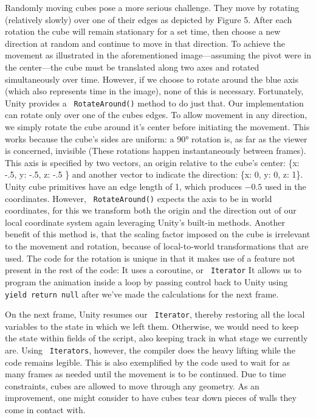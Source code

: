 \documentclass{report}
\newcommand{\cs}[1]{\texttt{\penalty 100 #1}}
\begin{document}
Randomly moving cubes pose a more serious challenge.
They move by rotating (relatively slowly) over one of their edges as depicted by Figure 5.
 After each rotation the cube will remain stationary for a set time, then choose a new direction at random and continue to move in that direction.
To achieve the movement as illustrated in the aforementioned image---assuming the pivot were in the center---the cube must be translated along two axes and rotated simultaneously over time. 
  However, if we choose to rotate around the blue axis (which also represents time in the image), none of this is necessary.
 Fortunately, Unity provides a \cs{RotateAround()} method to do just that.
Our implementation can rotate only over one of the cubes edges.
To allow movement in any direction, we simply rotate the cube around it's center before initiating the movement.
This works because the cube's sides are uniform: a 90° rotation is, as far as the viewer is concerned, invisible (These rotations happen instantaneously between frames).
This axis is specified by two vectors, an origin relative to the cube's center: \{x: -.5, y: -.5, z: -.5 \} and another vector to indicate the direction: \{x: 0, y: 0, z: 1\}.
Unity cube primitives have an edge length of 1, which produces $-0.5$ used in the coordinates. 
However, \cs{RotateAround()} expects the axis to be in world coordinates, for this we transform both the origin and the direction out of our local coordinate system again leveraging Unity's built-in methods. Another benefit of this method is, that the scaling factor imposed on the cube is irrelevant to the movement and rotation, because of local-to-world transformations that are used.
The code for the rotation is unique in that it makes use of a feature not present in the rest of the code: It uses a coroutine, or \cs{Iterator} 
 It allows us to program the animation inside a loop by passing control back to Unity using \cs{yield return null} after we've made the calculations for the next frame.

  On the next frame, Unity resumes our \cs{Iterator}, thereby restoring all the local variables to the state in which we left them. Otherwise, we would need to keep the state within fields of the script, also keeping track in what stage we currently are. 
 Using \cs{Iterators}, however, the compiler does the heavy lifting while the code remains legible. This is also exemplified by the code used to wait for as many frames as needed until the movement is to be continued.
Due to time constraints, cubes are allowed to move through any geometry. As an improvement, one might consider to have cubes tear down pieces of walls they come in contact with.
\end{document}
